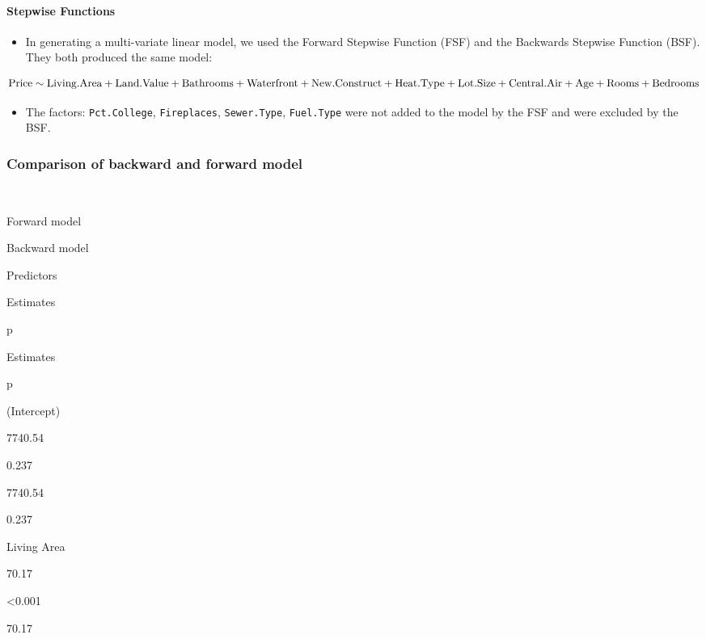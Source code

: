 \documentclass[letterpaper,9pt,twocolumn,twoside,]{pinp}
\providecommand{\tightlist}{%
  \setlength{\itemsep}{0pt}\setlength{\parskip}{0pt}}
\begin{document}
\hypertarget{stepwise-functions}{%
\paragraph{Stepwise Functions}\label{stepwise-functions}}

\begin{itemize}
\tightlist
\item
  In generating a multi-variate linear model, we used the Forward
  Stepwise Function (FSF) and the Backwards Stepwise Function (BSF).
  They both produced the same model:
\end{itemize}

\[\text{Price} \sim \text{Living.Area} + \text{Land.Value} + \text{Bathrooms} +\\ \text{Waterfront} +     \text{New.Construct} + \text{Heat.Type} + \text{Lot.Size} + \\\text{Central.Air} + \text{Age} + \text{Rooms} + \text{Bedrooms}\]

\begin{itemize}
\tightlist
\item
  The factors: \texttt{Pct.College}, \texttt{Fireplaces},
  \texttt{Sewer.Type}, \texttt{Fuel.Type} were not added to the model by
  the FSF and were excluded by the BSF.
\end{itemize}

\hypertarget{comparison-of-backward-and-forward-model}{%
\subsubsection{Comparison of backward and forward
model}\label{comparison-of-backward-and-forward-model}}

~

Forward model

Backward model

Predictors

Estimates

p

Estimates

p

(Intercept)

7740.54

0.237

7740.54

0.237

Living Area

70.17

\textless0.001

70.17
\end{document}
